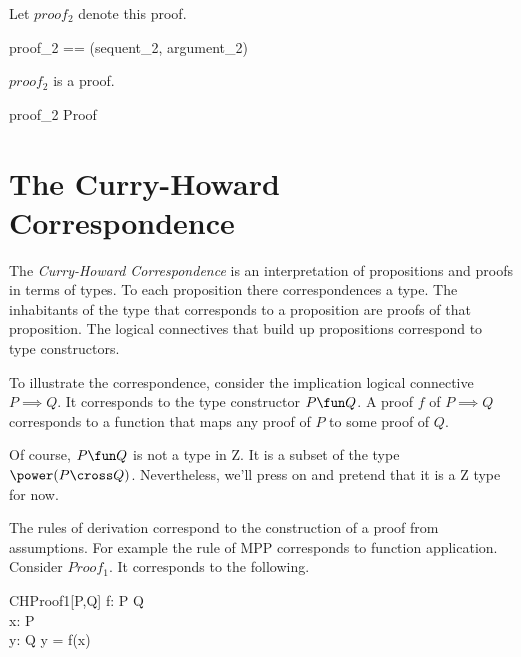 \documentclass[11pt, oneside]{article}
\begin{document}
Let $proof_2$ denote this proof.

\begin{zed}
	proof_2 ==  (sequent_2, argument_2)
\end{zed}

\begin{example}
$proof_2$ is a proof.

\begin{zed}
	proof_2 \in Proof
\end{zed}

\end{example}

\section{The Curry-Howard Correspondence}

The {\it Curry-Howard Correspondence} is an interpretation of propositions and proofs in terms of types.
To each proposition there correspondences a type.
The inhabitants of the type that corresponds to a proposition are proofs of that proposition.
The logical connectives that build up propositions correspond to type constructors.

To illustrate the correspondence, consider the implication logical connective $P \implies Q$.
It corresponds to the type constructor $P \fun Q$.
A proof $f$ of $P \implies Q$ corresponds to a function that maps any proof of $P$ to some proof of $Q$.

Of course, $P \fun Q$ is not a type in Z. 
It is a subset of the type $\power(P \cross Q)$.
Nevertheless, we'll press on and pretend that it is a Z type for now.

The rules of derivation correspond to the construction of a proof from assumptions.
For example the rule of MPP corresponds to function application.
Consider $Proof_1$.
It corresponds to the following.

\begin{schema}{CHProof1}[P,Q]
	f: P \fun Q \\
	x: P \\
	y: Q
\where
	y = f(x)
\end{schema}

\printbibliography
\end{document}
